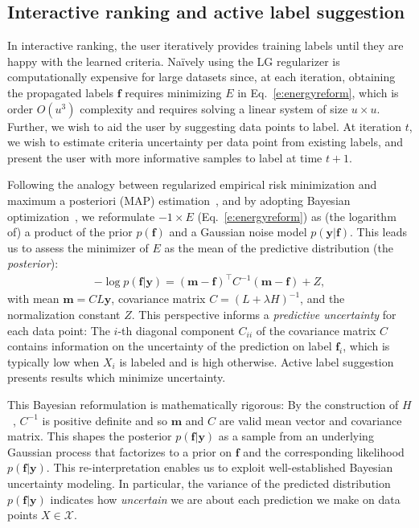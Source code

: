 \documentclass{article}
\newcommand{\mbf}{\mathbf{f}}
\newcommand{\mbm}{\mathbf{m}}
\newcommand{\mby}{\mathbf{y}}
\newcommand{\calX}{\mathcal{X}}
\begin{document}
\subsection{Interactive ranking and active label suggestion}
\label{sec:activelabelsuggestion}
In interactive ranking, the user iteratively provides training labels until they are happy with the learned criteria. Na\"{i}vely using the LG regularizer is computationally expensive for large datasets since, at each iteration, obtaining the propagated labels $\mbf$ requires minimizing $E$ in Eq.~\ref{e:energyreform}, which is order $O(u^3)$ complexity and requires solving a linear system of size $u\times u$. Further, we wish to aid the user by suggesting data points to label. At iteration $t$, we wish to estimate criteria uncertainty per data point from existing labels, and present the user with more informative samples to label at time $t+1$. 

Following the analogy between regularized empirical risk minimization and maximum a posteriori (MAP) estimation~\cite{RasWill06}, and by adopting Bayesian optimization~\cite{SnoLarAda12}, we reformulate $-1\times E$ (Eq.~\ref{e:energyreform}) as (the logarithm of) a product of the prior $p(\mbf)$ and a Gaussian noise model $p(\mby|\mbf)$. This leads us to assess the minimizer of $E$ as the mean of the predictive distribution (the \emph{posterior}):
\begin{align}
-\log p(\mbf|\mby) = (\mbm-\mbf)^\top C^{-1}(\mbm-\mbf) + Z,
\label{e:bayesian}
\end{align}
with mean $\mbm=C L \mby$, covariance matrix $C=(L+\lambda H)^{-1}$, and the normalization constant $Z$. This perspective informs a \emph{predictive uncertainty} for each data point: The $i$-th diagonal component $C_{ii}$ of the covariance matrix $C$ contains information on the uncertainty of the prediction on label $\mbf_i$, which is typically low when $X_i$ is labeled and is high otherwise. 
Active label suggestion presents results which minimize uncertainty. 

This Bayesian reformulation is mathematically rigorous: By the construction of $H$~\cite{KimTompkin2015}, $C^{-1}$ is positive definite and so $\mbm$ and $C$ are valid mean vector and covariance matrix. This shapes the posterior $p(\mbf|\mby)$ as a sample from an underlying Gaussian process that factorizes to a prior on $\mbf$ and the corresponding likelihood $p(\mbf|\mby)$. This re-interpretation enables us to exploit well-established Bayesian uncertainty modeling. In particular, the variance of the predicted distribution $p(\mbf|\mby)$ indicates how \emph{uncertain} we are about each prediction we make on data points $X\in\calX$. 
\end{document}

